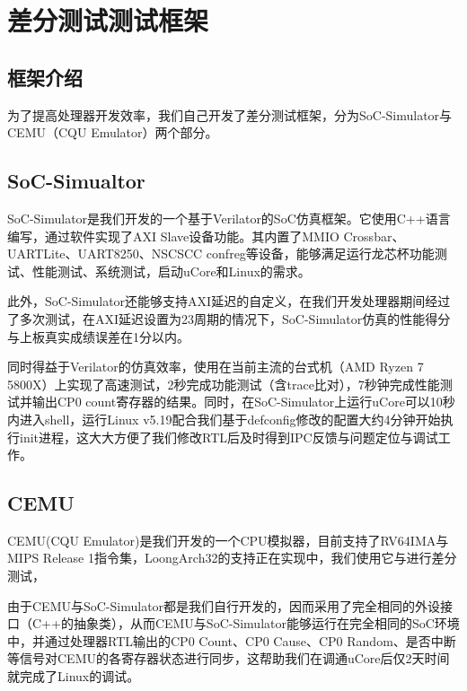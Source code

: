 \chapter{差分测试测试框架}

\section{框架介绍}

为了提高处理器开发效率，我们自己开发了差分测试框架，分为SoC-Simulator与CEMU（CQU Emulator）两个部分。

\section{SoC-Simualtor}

SoC-Simulator是我们开发的一个基于Verilator的SoC仿真框架。它使用C++语言编写，通过软件实现了AXI Slave设备功能。其内置了MMIO Crossbar、UARTLite、UART8250、NSCSCC confreg等设备，能够满足运行龙芯杯功能测试、性能测试、系统测试，启动uCore和Linux的需求。

此外，SoC-Simulator还能够支持AXI延迟的自定义，在我们开发处理器期间经过了多次测试，在AXI延迟设置为23周期的情况下，SoC-Simulator仿真的性能得分与上板真实成绩误差在1分以内。

同时得益于Verilator的仿真效率，使用\cpuname 在当前主流的台式机（AMD Ryzen 7 5800X）上实现了高速测试，2秒完成功能测试（含trace比对），7秒钟完成性能测试并输出CP0 count寄存器的结果。同时，在SoC-Simulator上运行uCore可以10秒内进入shell，运行Linux v5.19配合我们基于defconfig修改的配置大约4分钟开始执行init进程，这大大方便了我们修改RTL后及时得到IPC反馈与问题定位与调试工作。

\section{CEMU}

CEMU(CQU Emulator)是我们开发的一个CPU模拟器，目前支持了RV64IMA与MIPS Release 1指令集，LoongArch32的支持正在实现中，我们使用它与\cpuname 进行差分测试，

由于CEMU与SoC-Simulator都是我们自行开发的，因而采用了完全相同的外设接口（C++的抽象类），从而CEMU与SoC-Simulator能够运行在完全相同的SoC环境中，并通过处理器RTL输出的CP0 Count、CP0 Cause、CP0 Random、是否中断等信号对CEMU的各寄存器状态进行同步，这帮助我们在调通uCore后仅2天时间就完成了Linux的调试。